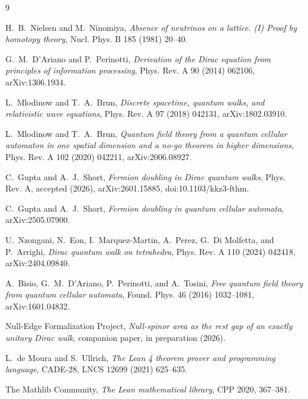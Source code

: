\documentclass[11pt]{article}
\begin{document}
\begin{thebibliography}{9}

H.~B.~Nielsen and M.~Ninomiya,
\emph{Absence of neutrinos on a lattice. (I) Proof by homotopy theory},
Nucl. Phys. B 185 (1981) 20--40.

G.~M.~D'Ariano and P.~Perinotti,
\emph{Derivation of the Dirac equation from principles of information
processing}, Phys. Rev. A 90 (2014) 062106, arXiv:1306.1934.

L.~Mlodinow and T.~A.~Brun,
\emph{Discrete spacetime, quantum walks, and relativistic wave equations},
Phys. Rev. A 97 (2018) 042131, arXiv:1802.03910.

L.~Mlodinow and T.~A.~Brun,
\emph{Quantum field theory from a quantum cellular automaton in one spatial
dimension and a no-go theorem in higher dimensions},
Phys. Rev. A 102 (2020) 042211, arXiv:2006.08927.

C.~Gupta and A.~J.~Short,
\emph{Fermion doubling in Dirac quantum walks},
Phys. Rev. A, accepted (2026), arXiv:2601.15885, doi:10.1103/kkz3-fthm.

C.~Gupta and A.~J.~Short,
\emph{Fermion doubling in quantum cellular automata}, arXiv:2505.07900.

U.~Nzongani, N.~Eon, I.~Marquez-Martin, A.~Perez, G.~Di Molfetta, and
P.~Arrighi,
\emph{Dirac quantum walk on tetrahedra},
Phys. Rev. A 110 (2024) 042418, arXiv:2404.09840.

A.~Bisio, G.~M.~D'Ariano, P.~Perinotti, and A.~Tosini,
\emph{Free quantum field theory from quantum cellular automata},
Found. Phys. 46 (2016) 1032--1081, arXiv:1601.04832.

Null-Edge Formalization Project,
\emph{Null-spinor area as the rest gap of an exactly unitary Dirac walk},
companion paper, in preparation (2026).

L.~de Moura and S.~Ullrich,
\emph{The Lean 4 theorem prover and programming language},
CADE-28, LNCS 12699 (2021) 625--635.

The Mathlib Community,
\emph{The Lean mathematical library}, CPP 2020, 367--381.

\end{thebibliography}
\end{document}
